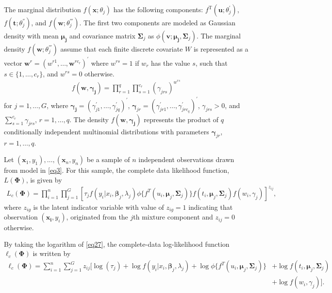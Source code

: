 \documentclass[11pt,letterpaper]{article}
\numberwithin{equation}{section}
\numberwithin{equation}{section}
\numberwithin{equation}{section}
\begin{document}
The marginal distribution $f(\bm{x};\theta_j)$ has the following components: $f^{\text{T}}(\bm{u};\theta_j^{'})$, $f(\bm{t};\theta_j^{''})$, and $f(\bm{w};\theta_{j}^{'''})$. The first two components are modeled as Gaussian density with mean $\bm {\mu_j}$ and covariance matrix $\bm \Sigma_j$ as $\phi(\bm v; \bm {\mu_j}, \bm \Sigma_j)$. The marginal density $f(\bm{w};\theta_{j}^{'''})$ assume that each finite discrete covariate $W$ is represented as a vector $\bm{w}^r=(w^{r1},\ldots,\bm{w}^{rc_r})^{'}$ where $w^{rs}=1$ if $w_r$ has the value $s$, such that $s\in\{1, \ldots, c_r\}$, %
and $w^{rs}=0$ otherwise.
\begin{align}
f(\bm {w}, \bm {\gamma_j})=\prod_{r=1}^{q}\prod_{s=1}^{c_r}(\gamma_{jrs} )^{w^{rs}} 
\label{eq31}
\end{align}
for $j=1, \ldots, G$, where $\bm {\gamma_j}=(\gamma_{j1}^{'}, \ldots, \gamma_{jq}^{'})^{'}$, $\bm \gamma_{jr}=(\gamma_{jr1}^{'}, \ldots, \gamma_{jrc_q}^{'})^{'}$, $\gamma_{jrs} > 0$, and  $\sum_{s=1}^{c_r}\gamma_{jrs}$, $r=1,\ldots,q$. The density $f(\bm {w}, \bm{\gamma_j})$ represents the product of $q$ conditionally independent multinomial distributions with parameters $\bm{\gamma}_{jr}$, $r=1,\ldots, q$.

Let $(\bm x_1, y_1),\ldots, (\bm x_n, y_n)$ be a sample of $n$ independent observations drawn from model in \eqref{eq3}.
For this sample, the complete data likelihood function, $L(\bm\Phi)$, is given by
\begin{align}
L_c(\bm\Phi)=\prod_{i=1}^{n}\prod_{j=1}^{G}\left[{\tau_j}f(y_i|x_i, \bm \beta_j, \lambda_{j})\phi\{f^T(u_i, \bm\mu_j, \bm\Sigma_j)\}f(t_i, \bm\mu_j, \bm\Sigma_j) f(w_i, \gamma_j) \right]^{z_{ij}},
\label{eq27}
\end{align}
where $z_{ig}$ is the latent indicator variable with value of $z_{ig}=1$ indicating that observation $(\bm{x_i}, y_i)$, originated from the $j$th mixture component and $z_{ij}=0$ otherwise.

By taking the logarithm of \eqref{eq27}, the complete-data log-likelihood function $\ell_c(\bm\Phi)$ is written by
\begin{equation*}\begin{split}
\ell_c(\bm\Phi)= \sum_{i=1}^{n}\sum_{j=1}^{G}{z_{ij}}\big[\log(\tau_{j}) + \log{f}(y_i|x_i,\bm \beta_j,\lambda_j)+ \log \phi\{f^T(u_i, \bm\mu_j, \bm\Sigma_j)\}& + \log f(t_i, \bm\mu_j, \bm\Sigma_j)\\& +\log {f}(w_i, \gamma_j)\big].
\label{eq28}
\end{split}\end{equation*}
\end{document}
